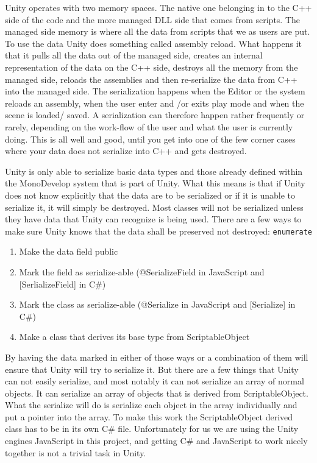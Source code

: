 Unity operates with two memory spaces. The native one belonging in to the C++ side of the code and the more managed DLL side that comes from scripts.
The managed side memory is where all the data from scripts that we as users are put.
To use the data Unity does something called assembly reload. What happens it that it pulls all the data out of the managed side, creates an
internal representation of the data on the C++ side, destroys all the memory from the managed side, reloads the assemblies and then
re-serialize the data from C++ into the managed side.
The serialization happens when the Editor or the system reloads an assembly, when the user enter and /or 
exits play mode and when the scene is loaded/ saved.
A serialization can therefore happen rather frequently or rarely, depending on the work-flow of the user
 and what the user is currently doing.
This is all well and good, until you get into one of the few corner cases where your data does not serialize into C++ and gets destroyed.

Unity is only able to serialize basic data types and those already defined within the MonoDevelop system that is part of Unity.
What this means is that if Unity does not know explicitly that the data are to be serialized or if it is unable
to serialize it, it will simply be destroyed. Most classes will not be serialized unless they have data that Unity 
can recognize is being used.
There are a few ways to make sure Unity knows that the data shall be preserved not destroyed:
\texttt{enumerate}
\begin{enumerate}
	\item Make the data field public
	\item Mark the field as serialize-able (@SerializeField in JavaScript and [SerlializeField] in C#)
	\item Mark the class as serialize-able (@Serialize in JavaScript and [Serialize] in C#)
	\item Make a class that derives its base type from ScriptableObject
\end {enumerate}

By having the data marked in either of those ways or a combination of them will ensure that Unity will try to
serialize it.
But there are a few things that Unity can not easily serialize, and most notably it can not serialize an array of normal objects.
It can serialize an array of objects that is derived from ScriptableObject. What the serialize will do is serialize each object in the
array individually and put a pointer into the array. To make this work the ScriptableObject derived class has to be in its own
C# file.
Unfortunately for us we are using the Unity engines JavaScript in this project, and getting C# and JavaScript to work nicely
together is not a trivial task in Unity.

